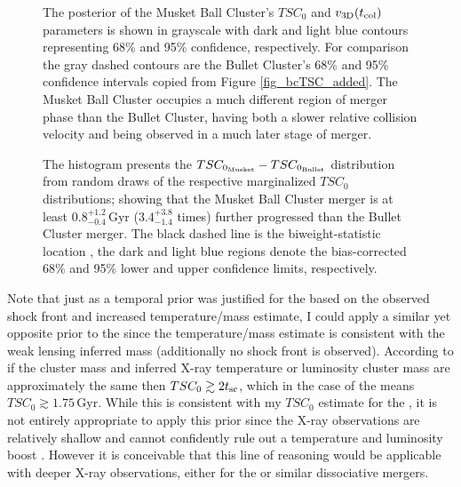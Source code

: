 \documentclass[12pt]{emulateapj}
\begin{document}
\begin{figure}
\caption{
The posterior of the Musket Ball Cluster's $TSC_0$ and $v_{\rm 3D}(t_{\rm col})$ parameters is shown in grayscale with dark and light blue contours representing 68\% and 95\% confidence, respectively.
For comparison the gray dashed contours are the Bullet Cluster's 68\% and 95\% confidence intervals copied from Figure \ref{fig_bcTSC_added}.
The Musket Ball Cluster occupies a much different region of merger phase than the Bullet Cluster, having both a slower relative collision velocity and being observed in a much later stage of merger.
\label{fig_mbc_TSC}}
\end{figure}

\begin{figure}
\caption{
The histogram presents the $TSC_{\rm 0_{Musket}}-TSC_{\rm 0_{Bullet}}$ distribution from random draws of the respective marginalized $TSC_0$ distributions; showing that the Musket Ball Cluster merger is at least $0.8^{+1.2}_{-0.4}$\,Gyr ($3.4^{+3.8}_{-1.4}$ times) further progressed than the Bullet Cluster merger.
The black dashed line is the biweight-statistic location \citep{Beers:1982dp}, the 
dark and light blue regions denote the bias-corrected  68\% and 95\% lower and upper confidence limits, respectively.
\label{fig_TSC0comparison}}
\end{figure}

Note that just as a temporal prior was justified for the  based on the observed shock front and increased temperature/mass estimate, I could apply a similar yet opposite prior to the  since the temperature/mass estimate is consistent with the weak lensing inferred mass (additionally no shock front is observed).  
According to \citet{Randall:2002kk} if the cluster mass and inferred X-ray temperature or luminosity cluster mass are approximately the same then $TSC_0 \gtrsim 2 t_{\rm sc}$, which in the case of the  means $TSC_0 \gtrsim 1.75$\,Gyr.
While this is consistent with my $TSC_0$ estimate for the , it is not entirely appropriate to apply this prior since the X-ray observations are relatively shallow and cannot confidently rule out a temperature and luminosity boost \citep{Dawson:2012dl}.
However it is conceivable that this line of reasoning would be applicable with deeper X-ray observations, either for the  or similar dissociative mergers.
\end{document}
